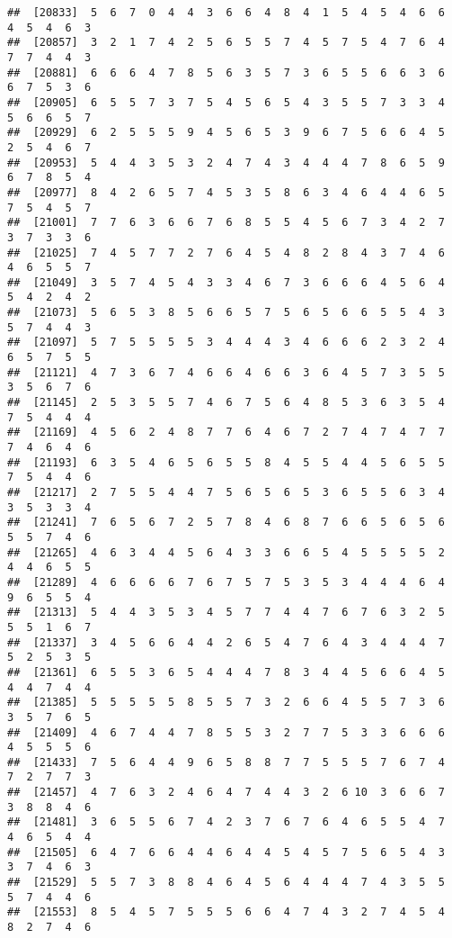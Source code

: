 \documentclass[
]{book}
\begin{document}
\begin{verbatim}
##  [20833]  5  6  7  0  4  4  3  6  6  4  8  4  1  5  4  5  4  6  6  4  5  4  6  3
##  [20857]  3  2  1  7  4  2  5  6  5  5  7  4  5  7  5  4  7  6  4  7  7  4  4  3
##  [20881]  6  6  6  4  7  8  5  6  3  5  7  3  6  5  5  6  6  3  6  6  7  5  3  6
##  [20905]  6  5  5  7  3  7  5  4  5  6  5  4  3  5  5  7  3  3  4  5  6  6  5  7
##  [20929]  6  2  5  5  5  9  4  5  6  5  3  9  6  7  5  6  6  4  5  2  5  4  6  7
##  [20953]  5  4  4  3  5  3  2  4  7  4  3  4  4  4  7  8  6  5  9  6  7  8  5  4
##  [20977]  8  4  2  6  5  7  4  5  3  5  8  6  3  4  6  4  4  6  5  7  5  4  5  7
##  [21001]  7  7  6  3  6  6  7  6  8  5  5  4  5  6  7  3  4  2  7  3  7  3  3  6
##  [21025]  7  4  5  7  7  2  7  6  4  5  4  8  2  8  4  3  7  4  6  4  6  5  5  7
##  [21049]  3  5  7  4  5  4  3  3  4  6  7  3  6  6  6  4  5  6  4  5  4  2  4  2
##  [21073]  5  6  5  3  8  5  6  6  5  7  5  6  5  6  6  5  5  4  3  5  7  4  4  3
##  [21097]  5  7  5  5  5  5  3  4  4  4  3  4  6  6  6  2  3  2  4  6  5  7  5  5
##  [21121]  4  7  3  6  7  4  6  6  4  6  6  3  6  4  5  7  3  5  5  3  5  6  7  6
##  [21145]  2  5  3  5  5  7  4  6  7  5  6  4  8  5  3  6  3  5  4  7  5  4  4  4
##  [21169]  4  5  6  2  4  8  7  7  6  4  6  7  2  7  4  7  4  7  7  7  4  6  4  6
##  [21193]  6  3  5  4  6  5  6  5  5  8  4  5  5  4  4  5  6  5  5  7  5  4  4  6
##  [21217]  2  7  5  5  4  4  7  5  6  5  6  5  3  6  5  5  6  3  4  3  5  3  3  4
##  [21241]  7  6  5  6  7  2  5  7  8  4  6  8  7  6  6  5  6  5  6  5  5  7  4  6
##  [21265]  4  6  3  4  4  5  6  4  3  3  6  6  5  4  5  5  5  5  2  4  4  6  5  5
##  [21289]  4  6  6  6  6  7  6  7  5  7  5  3  5  3  4  4  4  6  4  9  6  5  5  4
##  [21313]  5  4  4  3  5  3  4  5  7  7  4  4  7  6  7  6  3  2  5  5  5  1  6  7
##  [21337]  3  4  5  6  6  4  4  2  6  5  4  7  6  4  3  4  4  4  7  5  2  5  3  5
##  [21361]  6  5  5  3  6  5  4  4  4  7  8  3  4  4  5  6  6  4  5  4  4  7  4  4
##  [21385]  5  5  5  5  5  8  5  5  7  3  2  6  6  4  5  5  7  3  6  3  5  7  6  5
##  [21409]  4  6  7  4  4  7  8  5  5  3  2  7  7  5  3  3  6  6  6  4  5  5  5  6
##  [21433]  7  5  6  4  4  9  6  5  8  8  7  7  5  5  5  7  6  7  4  7  2  7  7  3
##  [21457]  4  7  6  3  2  4  6  4  7  4  4  3  2  6 10  3  6  6  7  3  8  8  4  6
##  [21481]  3  6  5  5  6  7  4  2  3  7  6  7  6  4  6  5  5  4  7  4  6  5  4  4
##  [21505]  6  4  7  6  6  4  4  6  4  4  5  4  5  7  5  6  5  4  3  3  7  4  6  3
##  [21529]  5  5  7  3  8  8  4  6  4  5  6  4  4  4  7  4  3  5  5  5  7  4  4  6
##  [21553]  8  5  4  5  7  5  5  5  6  6  4  7  4  3  2  7  4  5  4  8  2  7  4  6

\end{verbatim}
\end{document}
